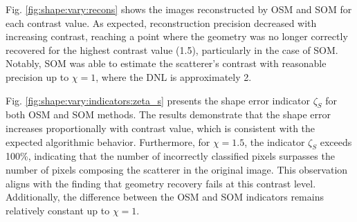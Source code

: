\documentclass{IEEEtran}
\begin{document}

                Fig. \ref{fig:shape:vary:recons} shows the images reconstructed by OSM and SOM for each contrast value. As expected, reconstruction precision decreased with increasing contrast, reaching a point where the geometry was no longer correctly recovered for the highest contrast value (1.5), particularly in the case of SOM. Notably, SOM was able to estimate the scatterer's contrast with reasonable precision up to $\chi = 1$, where the DNL is approximately 2.


                Fig. \ref{fig:shape:vary:indicators:zeta_s} presents the shape error indicator $\zeta_S$ for both OSM and SOM methods. The results demonstrate that the shape error increases proportionally with contrast value, which is consistent with the expected algorithmic behavior. Furthermore, for $\chi = 1.5$, the indicator $\zeta_S$ exceeds 100\%, indicating that the number of incorrectly classified pixels surpasses the number of pixels composing the scatterer in the original image. This observation aligns with the finding that geometry recovery fails at this contrast level. Additionally, the difference between the OSM and SOM indicators remains relatively constant up to $\chi = 1$.
\end{document}

